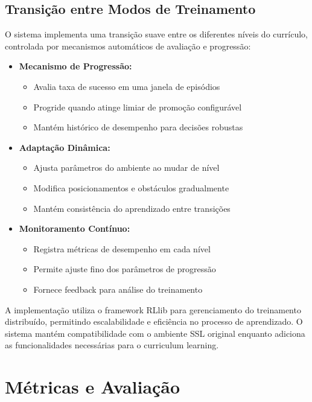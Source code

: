 \subsection{Transição entre Modos de Treinamento}
O sistema implementa uma transição suave entre os diferentes níveis do currículo, controlada por mecanismos automáticos de avaliação e progressão:

\begin{itemize}
    \item \textbf{Mecanismo de Progressão:}
    \begin{itemize}
        \item Avalia taxa de sucesso em uma janela de episódios
        \item Progride quando atinge limiar de promoção configurável
        \item Mantém histórico de desempenho para decisões robustas
    \end{itemize}

    \item \textbf{Adaptação Dinâmica:}
    \begin{itemize}
        \item Ajusta parâmetros do ambiente ao mudar de nível
        \item Modifica posicionamentos e obstáculos gradualmente
        \item Mantém consistência do aprendizado entre transições
    \end{itemize}

    \item \textbf{Monitoramento Contínuo:}
    \begin{itemize}
        \item Registra métricas de desempenho em cada nível
        \item Permite ajuste fino dos parâmetros de progressão
        \item Fornece feedback para análise do treinamento
    \end{itemize}
\end{itemize}

A implementação utiliza o framework RLlib para gerenciamento do treinamento distribuído, permitindo escalabilidade e eficiência no processo de aprendizado. O sistema mantém compatibilidade com o ambiente SSL original enquanto adiciona as funcionalidades necessárias para o curriculum learning.



\section{Métricas e Avaliação}

